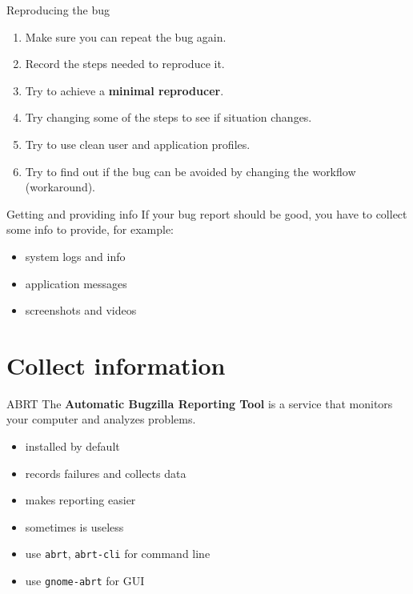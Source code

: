\documentclass[12pt]{beamer}
\begin{document}
\begin{frame}{Reproducing the bug}
	\begin{enumerate}
		\item Make sure you can repeat the bug again.
		\item Record the steps needed to reproduce it.
		\item Try to achieve a \textbf{minimal reproducer}.
		\item Try changing some of the steps to see if situation changes.
		\item Try to use clean user and application profiles.
		\item Try to find out if the bug can be avoided by changing the workflow (workaround).
	\end{enumerate}
\end{frame}

\begin{frame}{Getting and providing info}
If your bug report should be good, you have to collect some info to provide, for example:
\begin{itemize}
	\item system logs and info
	\item application messages
	\item screenshots and videos
\end{itemize}
\end{frame}

\section{Collect information}
\begin{frame}{ABRT}
The \textbf{Automatic Bugzilla Reporting Tool} is a service that monitors your computer and analyzes problems.
\begin{itemize}
	\item installed by default
	\item records failures and collects data
	\item makes reporting easier
	\item sometimes is useless
	\item use {\color{blue}\texttt{abrt}}, {\color{blue} \texttt{abrt-cli}} for command line
	\item use {\color{blue} \texttt{gnome-abrt}} for GUI 
\end{itemize}
\end{frame}
\end{document}
